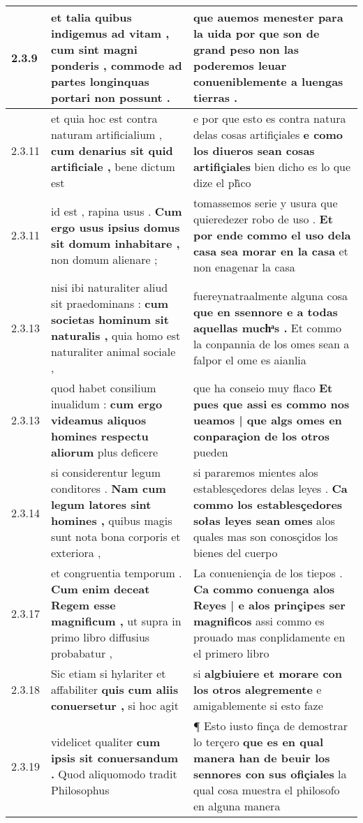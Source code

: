\begin{tabular}{|p{1cm}|p{6.5cm}|p{6.5cm}|}
2.3.9 & et talia quibus indigemus ad vitam , \textbf{ cum sint magni ponderis , } commode ad partes longinquas portari non possunt . & que auemos menester para la uida \textbf{ por que son de grand peso } non las poderemos leuar conueniblemente a luengas tierras . \\\hline
2.3.11 & et quia hoc est contra naturam artificialium , \textbf{ cum denarius sit quid artificiale , } bene dictum est & e por que esto es contra natura delas cosas artifiçiales \textbf{ e como los diueros sean cosas artifiçiales } bien dicho es lo que dize el ph̃co \\\hline
2.3.11 & id est , rapina usus . \textbf{ Cum ergo usus ipsius domus sit domum inhabitare , } non domum alienare ; & tomassemos serie y usura que quieredezer robo de uso . \textbf{ Et por ende commo el uso dela casa sea morar en la casa } et non enagenar la casa \\\hline
2.3.13 & nisi ibi naturaliter aliud sit praedominans : \textbf{ cum societas hominum sit naturalis , } quia homo est naturaliter animal sociale , & fuereynatraalmente alguna cosa \textbf{ que en ssennore e a todas aquellas muchͣs . } Et commo la conpannia de los omes sean a falpor el ome es aianlia \\\hline
2.3.13 & quod habet consilium inualidum : \textbf{ cum ergo videamus aliquos homines respectu aliorum } plus deficere & que ha conseio muy flaco \textbf{ Et pues que assi es commo nos ueamos | que algs omes en conparaçion de los otros } pueden \\\hline
2.3.14 & si considerentur legum conditores . \textbf{ Nam cum legum latores sint homines , } quibus magis sunt nota bona corporis et exteriora , & si pararemos mientes alos establesçedores delas leyes . \textbf{ Ca commo los establesçedores sołas leyes sean omes } alos quales mas son conosçidos los bienes del cuerpo \\\hline
2.3.17 & et congruentia temporum . \textbf{ Cum enim deceat Regem esse magnificum , } ut supra in primo libro diffusius probabatur , & La conueniençia de los tiepos . \textbf{ Ca commo conuenga alos Reyes | e alos prinçipes ser magnificos } assi commo es prouado mas conplidamente en el primero libro \\\hline
2.3.18 & Sic etiam si hylariter et affabiliter \textbf{ quis cum aliis conuersetur , } si hoc agit & si \textbf{ algbiuiere et morare con los otros alegremente } e amigablemente si esto faze \\\hline
2.3.19 & videlicet qualiter \textbf{ cum ipsis sit conuersandum . } Quod aliquomodo tradit Philosophus & ¶ Esto iusto finça de demostrar lo terçero \textbf{ que es en qual manera han de beuir los sennores con sus ofiçiales } la qual cosa muestra el philosofo en alguna manera \\\hline

\end{tabular}
